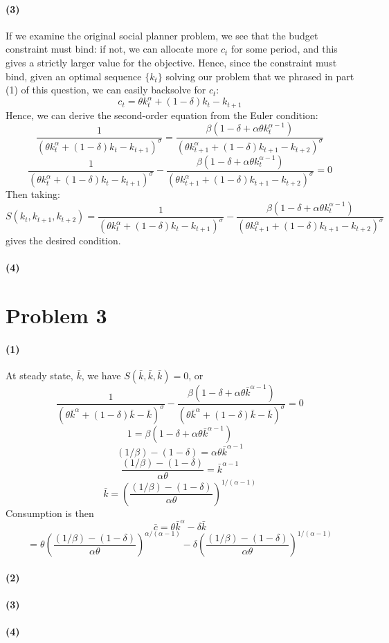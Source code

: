 \documentclass[10pt,letter]{article}
\newcommand{\problem}[1]{\section*{Problem #1}}
\newcommand{\problempart}[1]{\paragraph{#1}}
\begin{document}
\problempart{(3)} If we examine the original social planner problem, we see that the budget constraint must bind: if not, we can allocate more $c_t$ for some period, and this gives a strictly larger value for the objective. Hence, since the constraint must bind, given an optimal sequence $\{ k_t \}$ solving our problem that we phrased in part (1) of this question, we can easily backsolve for $c_t$:
\[ c_t = \theta k_t^\alpha + (1-\delta)k_t - k_{t+1} \]
Hence, we can derive the second-order equation from the Euler condition:
\[ \frac{1}{(\theta k_t^\alpha + (1-\delta)k_t - k_{t+1})^\sigma} = \frac{\beta(1-\delta + \alpha \theta k_t^{\alpha - 1})}{(\theta k_{t+1}^\alpha + (1-\delta)k_{t+1} - k_{t+2})^\sigma} \]
\[ \frac{1}{(\theta k_t^\alpha + (1-\delta)k_t - k_{t+1})^\sigma} - \frac{\beta(1-\delta + \alpha \theta k_t^{\alpha - 1})}{(\theta k_{t+1}^\alpha + (1-\delta)k_{t+1} - k_{t+2})^\sigma} = 0 \]
Then taking:
\[ S(k_t, k_{t+1}, k_{t+2} ) = \frac{1}{(\theta k_t^\alpha + (1-\delta)k_t - k_{t+1})^\sigma} - \frac{\beta(1-\delta + \alpha \theta k_t^{\alpha - 1})}{(\theta k_{t+1}^\alpha + (1-\delta)k_{t+1} - k_{t+2})^\sigma} \]
gives the desired condition.

\problempart{(4)}
\problem{3}
\problempart{(1)}
At steady state, $\bar{k}$, we have
$S(\bar{k}, \bar{k}, \bar{k}) = 0$, or
\[\frac{1}{(\theta \bar{k}^\alpha + (1-\delta)\bar{k} - \bar{k})^\sigma} - \frac{\beta(1-\delta + \alpha \theta \bar{k}^{\alpha - 1})}{(\theta \bar{k}^\alpha + (1-\delta)\bar{k} - \bar{k})^\sigma} = 0 \]
\[1 = \beta(1-\delta + \alpha \theta \bar{k}^{\alpha - 1}) \]
\[ (1/\beta) - (1-\delta) = \alpha \theta \bar{k}^{\alpha - 1} \]
\[ \frac{(1/\beta) - (1-\delta)}{\alpha \theta} = \bar{k}^{\alpha - 1} \]
\[ \bar{k} = \left(\frac{(1/\beta) - (1-\delta)}{\alpha \theta} \right)^{1/(\alpha - 1)} \]
Consumption is then
\[ \bar{c} = \theta \bar{k}^\alpha - \delta \bar{k}   \]
\[ = \theta \left(\frac{(1/\beta) - (1-\delta)}{\alpha \theta} \right)^{\alpha/(\alpha - 1)} - \delta \left(\frac{(1/\beta) - (1-\delta)}{\alpha \theta} \right)^{1/(\alpha - 1)} \]

\problempart{(2)}
\problempart{(3)}
\problempart{(4)}
\end{document}
